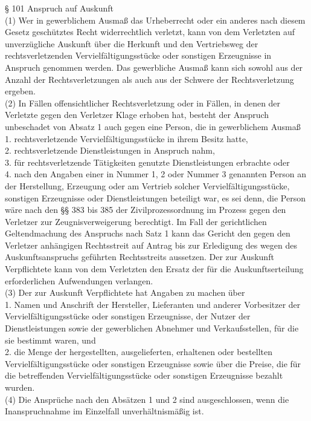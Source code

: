 \documentclass[12pt,titlepage]{report}
\begin{document}
§ 101 Anspruch auf Auskunft\\
(1) Wer in gewerblichem Ausmaß das Urheberrecht oder ein anderes nach diesem Gesetz geschütztes Recht widerrechtlich verletzt, kann von dem Verletzten auf unverzügliche Auskunft über die Herkunft und den Vertriebsweg der rechtsverletzenden Vervielfältigungsstücke oder sonstigen Erzeugnisse in Anspruch genommen werden. Das gewerbliche Ausmaß kann sich sowohl aus der Anzahl der Rechtsverletzungen als auch aus der Schwere der Rechtsverletzung ergeben.\\
(2) In Fällen offensichtlicher Rechtsverletzung oder in Fällen, in denen der Verletzte gegen den Verletzer Klage erhoben hat, besteht der Anspruch unbeschadet von Absatz 1 auch gegen eine Person, die in gewerblichem Ausmaß\\
1.
rechtsverletzende Vervielfältigungsstücke in ihrem Besitz hatte,\\
2.
rechtsverletzende Dienstleistungen in Anspruch nahm,\\
3.
für rechtsverletzende Tätigkeiten genutzte Dienstleistungen erbrachte oder\\
4.
nach den Angaben einer in Nummer 1, 2 oder Nummer 3 genannten Person an der Herstellung, Erzeugung oder am Vertrieb solcher Vervielfältigungsstücke, sonstigen Erzeugnisse oder Dienstleistungen beteiligt war,
es sei denn, die Person wäre nach den §§ 383 bis 385 der Zivilprozessordnung im Prozess gegen den Verletzer zur Zeugnisverweigerung berechtigt. Im Fall der gerichtlichen Geltendmachung des Anspruchs nach Satz 1 kann das Gericht den gegen den Verletzer anhängigen Rechtsstreit auf Antrag bis zur Erledigung des wegen des Auskunftsanspruchs geführten Rechtsstreits aussetzen. Der zur Auskunft Verpflichtete kann von dem Verletzten den Ersatz der für die Auskunftserteilung erforderlichen Aufwendungen verlangen.\\
(3) Der zur Auskunft Verpflichtete hat Angaben zu machen über\\
1.
Namen und Anschrift der Hersteller, Lieferanten und anderer Vorbesitzer der Vervielfältigungsstücke oder sonstigen Erzeugnisse, der Nutzer der Dienstleistungen sowie der gewerblichen Abnehmer und Verkaufsstellen, für die sie bestimmt waren, und\\
2.
die Menge der hergestellten, ausgelieferten, erhaltenen oder bestellten Vervielfältigungsstücke oder sonstigen Erzeugnisse sowie über die Preise, die für die betreffenden Vervielfältigungsstücke oder sonstigen Erzeugnisse bezahlt wurden.\\
(4) Die Ansprüche nach den Absätzen 1 und 2 sind ausgeschlossen, wenn die Inanspruchnahme im Einzelfall unverhältnismäßig ist.\\
\end{document}
